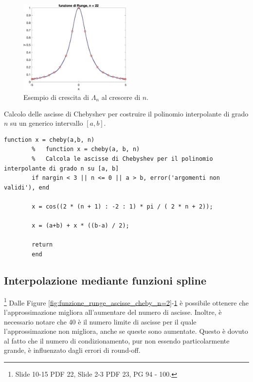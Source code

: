 \begin{figure}
    \centering
    \includegraphics[width=0.5\textwidth]{immagini/funzione_runge_ascisse_cheby_n=22.jpg}
    \caption{Esempio di crescita di $\Lambda_n$ al crescere di $n$.}\label{fig:funzione_runge_ascisse_cheby_n=22}
\end{figure}

\begin{algorithm}\caption{Calcolo delle ascisse di Chebyshev per costruire il polinomio interpolante di grado $n$ su un generico intervallo $[a, b]$.}
	\label{alg:cheby}
	\begin{lstlisting}[style=Matlab-editor]
		function x = cheby(a,b, n)
		%	function x = cheby(a, b, n)
		%	Calcola le ascisse di Chebyshev per il polinomio interpolante di grado n su [a, b]
		if nargin < 3 || n <= 0 || a > b, error('argomenti non validi'), end
		
		x = cos((2 * (n + 1) : -2 : 1) * pi / ( 2 * n + 2));
		
		x = (a+b) + x * ((b-a) / 2);
		
		return 
		end
	\end{lstlisting}
\end{algorithm}

\subsection{Interpolazione mediante funzioni spline} \footnote{Slide 10-15 PDF 22, Slide 2-3 PDF 23, PG 94 - 100.}
Dalle Figure \ref{fig:funzione_runge_ascisse_cheby_n=2}-\ref{fig:funzione_runge_ascisse_cheby_n=22} è possibile ottenere che l'approssimazione migliora all'aumentare del numero di ascisse. Inoltre, è necessario notare che 40 è il numero limite di ascisse per il quale l'approssimazione non migliora, anche se queste sono aumentate. Questo è dovuto al fatto che il numero di condizionamento, pur non essendo particolarmente grande, è influenzato dagli errori di round-off.

